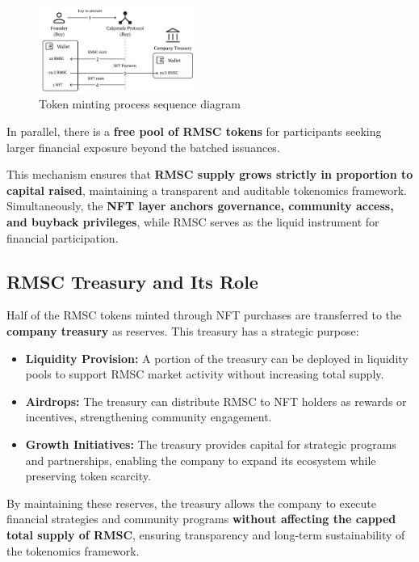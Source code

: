 \documentclass[conference]{IEEEtran}
\begin{document}
\begin{figure}[ht]
\centering
\includegraphics[width=0.45\textwidth]{minting-diagram.pdf}
\caption{Token minting process sequence diagram}
\label{fig:minting-strategy}
\end{figure}

In parallel, there is a \textbf{free pool of RMSC tokens} for participants seeking larger financial exposure beyond the batched issuances.

This mechanism ensures that \textbf{RMSC supply grows strictly in proportion to capital raised}, maintaining a transparent and auditable tokenomics framework. Simultaneously, the \textbf{NFT layer anchors governance, community access, and buyback privileges}, while RMSC serves as the liquid instrument for financial participation.

\subsection{RMSC Treasury and Its Role}

Half of the RMSC tokens minted through NFT purchases are transferred to the \textbf{company treasury} as reserves. This treasury has a strategic purpose:

\begin{itemize}
    \item \textbf{Liquidity Provision:} A portion of the treasury can be deployed in liquidity pools to support RMSC market activity without increasing total supply.
    \item \textbf{Airdrops:} The treasury can distribute RMSC to NFT holders as rewards or incentives, strengthening community engagement.
    \item \textbf{Growth Initiatives:} The treasury provides capital for strategic programs and partnerships, enabling the company to expand its ecosystem while preserving token scarcity.
\end{itemize}

By maintaining these reserves, the treasury allows the company to execute financial strategies and community programs \textbf{without affecting the capped total supply of RMSC}, ensuring transparency and long-term sustainability of the tokenomics framework.
\end{document}
